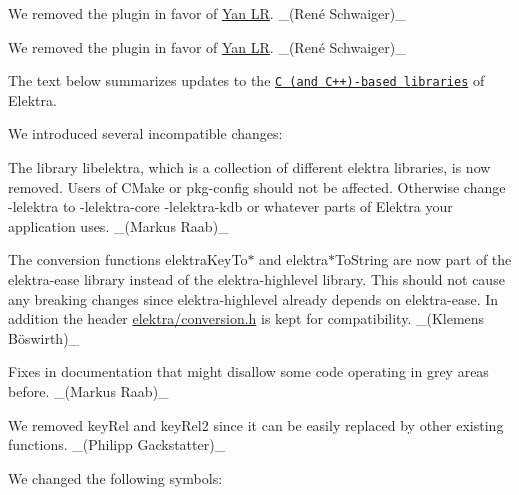 \begin{DoxyItemize}
\item We removed the plugin in favor of \hyperlink{autotoc_md955_src_plugins_yanlr_README_md}{Yan LR}. \+\_\+(René Schwaiger)\+\_\+
\end{DoxyItemize}


\begin{DoxyItemize}
\item We removed the plugin in favor of \hyperlink{autotoc_md955_src_plugins_yanlr_README_md}{Yan LR}. \+\_\+(René Schwaiger)\+\_\+
\end{DoxyItemize}

The text below summarizes updates to the \href{https://www.libelektra.org/libraries/readme}{\tt C (and C++)-\/based libraries} of Elektra.

We introduced several incompatible changes\+:


\begin{DoxyItemize}
\item The library {\ttfamily libelektra}, which is a collection of different elektra libraries, is now removed. Users of C\+Make or pkg-\/config should not be affected. Otherwise change {\ttfamily -\/lelektra} to {\ttfamily -\/lelektra-\/core -\/lelektra-\/kdb} or whatever parts of Elektra your application uses. \+\_\+(\+Markus Raab)\+\_\+
\item The conversion functions {\ttfamily elektra\+Key\+To$\ast$} and {\ttfamily elektra$\ast$\+To\+String} are now part of the {\ttfamily elektra-\/ease} library instead of the {\ttfamily elektra-\/highlevel} library. This should not cause any breaking changes since {\ttfamily elektra-\/highlevel} already depends on {\ttfamily elektra-\/ease}. In addition the header {\ttfamily \hyperlink{conversion_8h}{elektra/conversion.\+h}} is kept for compatibility. \+\_\+(Klemens Böswirth)\+\_\+
\item Fixes in documentation that might disallow some code operating in grey areas before. \+\_\+(\+Markus Raab)\+\_\+
\item We removed {\ttfamily key\+Rel} and {\ttfamily key\+Rel2} since it can be easily replaced by other existing functions. \+\_\+(\+Philipp Gackstatter)\+\_\+
\end{DoxyItemize}

We changed the following symbols\+:


